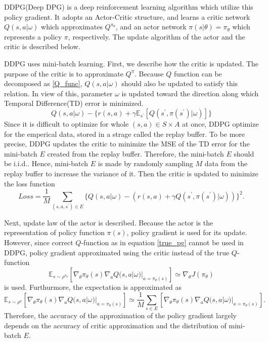 \documentclass[english, dvipdfmx]{ampmt}             %
\newcommand{\expect}{\mathbb{E}}
\begin{document}
DDPG(Deep DPG)\cite{DDPG} is a deep reinforcement learning algorithm which utilize this policy gradient. It adopts an Actor-Critic structure, and learns a critic network $Q(s,a|\omega)$ which approximates $Q^{\pi_{\theta}}$, and an actor network $\pi(s|\theta)=\pi_{\theta}$ which represents a policy $\pi$, respectively. The update algorithm of the actor and the critic is described below.\par
DDPG uses mini-batch learning. First, we describe how the critic is updated. The purpose of the critic is to approximate $Q^{\pi}$. Because $Q$ function can be decomposed as \eqref{Q_func}, $Q(s,a|\omega)$ should also be updated to satisfy this relation. In view of this, parameter $\omega$ is updated toward the direction along which Temporal Difference(TD) error is minimized.
\begin{equation}
	Q(s,a|\omega) - \{r(s,a)+\gamma \expect_{s^{\prime}}[Q(s^{\prime},\pi(s^{\prime})|\omega)]\}
\end{equation}
Since it is difficult to optimize for whole $(s,a) \in S\times A$ at once, DDPG optimize for the emperical data, stored in a strage called the replay buffer. To be more precise, DDPG updates the critic to minimize the MSE of the TD error for the mini-batch $E$ created from the replay buffer. Therefore, the mini-batch $E$ should be i.i.d.. Hence, mini-batch $E$ is made by randomly sampling $M$ data from the replay buffer to increase the variance of it. Then the critic is updated to minimize the loss function
\begin{equation}
	Loss = \frac{1}{M}\sum_{(s,a,s^{\prime})\in E} \{Q(s,a|\omega) - (r(s,a)+\gamma Q(s^{\prime},\pi(s^{\prime})|\omega))\}^2.
\end{equation}\par
Next, update law of the actor is described. Because the actor is the representation of policy function $\pi(s)$, policy gradient is used for its update. However, since correct $Q$-function as in equation \eqref{true_pg} cannot be used in DDPG, policy gradient approximated using the critic instead of the true $Q$-function
\begin{equation}
	\expect_{s\sim\rho^{\pi_{\theta}}}[\nabla_{\theta}\pi_{\theta}(s)\nabla_{a}Q(s, a|\omega)|_{a=\pi_{\theta}(s)}] \simeq \nabla_{\theta}J(\pi_{\theta}) 
\end{equation}
 is used. Furthurmore, the expectation is approximated as
 \begin{equation}
	\expect_{s\sim\rho^{\pi}}[\nabla_{\theta}\pi_{\theta}(s)\nabla_{a}Q(s, a|\omega)|_{a=\pi_{\theta}(s)}] \simeq \frac{1}{M}\sum_{s\in E}[\nabla_{\theta}\pi_{\theta}(s)\nabla_{a}Q(s, a|\omega)|_{a=\pi_{\theta}(s)}]. \label{expectation_approximation}
\end{equation}
Therefore, the accuracy of the approximation of the policy gradient largely depends on the accuracy of critic approximation and the distribution of mini-batch $E$.
\end{document}
